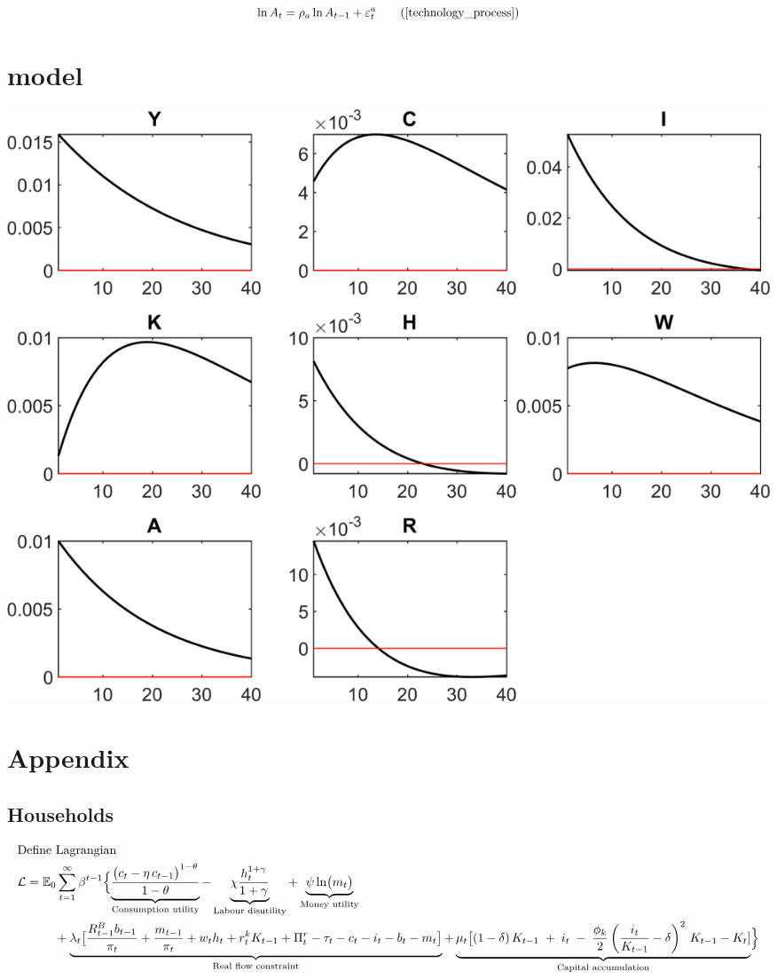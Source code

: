 \documentclass[11pt,preprint]{elsarticle}
\let\origfigure\figure
\let\endorigfigure\endfigure
\renewenvironment{figure}[1][2] {
    \expandafter\origfigure\expandafter[H]
} {
    \endorigfigure
}
\numberwithin{equation}{section}
\numberwithin{figure}{section}
\numberwithin{table}{section}
\begin{document}
\begin{equation}
\ln A_t = \rho_a \ln A_{t-1} + \varepsilon_t^a 
\tag{\ref{technology_process}}
\end{equation}

\newpage

\section{model}\label{model}

\begin{figure}
\centering
\includegraphics{code/rbc_model/rbc_model/graphs/rbc_model_IRF_eps_cropped.png}
\caption{image}
\end{figure}

\newpage

\section{Appendix}\label{appendix}

\subsection{Households}\label{households-1}

\begin{align*}
  & \text{Define Lagrangian} \\
  & \mathcal{L} = \mathbb{E}_0 \sum_{t=1}^{\infty} \beta^{t-1} \Bigl\{
    \underbrace{\frac{\bigl(c_t-\eta \, c_{t-1}\bigr)^{1-\theta}}{1-\theta}}_{\text{Consumption utility}}
    - \underbrace{\chi\frac{h_t^{1+\gamma}}{1+\gamma}}_{\text{Labour disutility}}
    + \underbrace{\psi\ln\bigl(m_t\bigr)}_{\text{Money utility}} \\
  & \quad\qquad
    + \underbrace{\lambda_t\bigl[\dfrac{R^B_{t-1}b_{t-1}}{\pi_t} + \dfrac{m_{t-1}}{\pi_t} + w_t h_t + r^k_t K_{t-1} + \Pi^r_t - \tau_t -c_t - i_t - b_t - m_t\bigr]}_{\text{Real flow constraint}}
    + \underbrace{\mu_t\bigl[(1 - \delta)\,K_{t-1}
\;+\; i_t
\;-\;\frac{\phi_k}{2}
\left(\frac{i_t}{K_{t-1}} - \delta\right)^{2}
\,K_{t-1} - K_t]}_{\text{Capital accumulation}}
  \Bigr\}
\end{align*}
\end{document}
